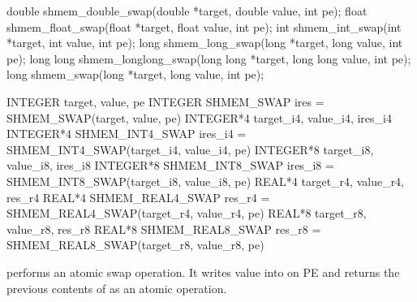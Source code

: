 \synC
 	  
double shmem_double_swap(double *target, double value, int pe);
float shmem_float_swap(float *target, float value, int pe);
int shmem_int_swap(int *target, int value, int pe);
long shmem_long_swap(long *target, long value, int pe);
long long shmem_longlong_swap(long long *target, long long value, int pe);
long shmem_swap(long *target, long value, int pe); %

\synF   %

INTEGER target, value, pe
INTEGER SHMEM_SWAP
ires = SHMEM_SWAP(target, value, pe) 
INTEGER*4 target_i4, value_i4, ires_i4
INTEGER*4 SHMEM_INT4_SWAP
ires_i4 = SHMEM_INT4_SWAP(target_i4, value_i4, pe) 
INTEGER*8 target_i8, value_i8, ires_i8
INTEGER*8 SHMEM_INT8_SWAP
ires_i8 = SHMEM_INT8_SWAP(target_i8, value_i8, pe)
REAL*4 target_r4, value_r4, res_r4
REAL*4 SHMEM_REAL4_SWAP
res_r4 = SHMEM_REAL4_SWAP(target_r4, value_r4, pe) 
REAL*8 target_r8, value_r8, res_r8
REAL*8 SHMEM_REAL8_SWAP
res_r8 = SHMEM_REAL8_SWAP(target_r8, value_r8, pe) %

{        performs  an atomic swap operation. It writes value  into \target{} on \ac{PE} and	returns the previous
       contents of \target{} as an atomic operation. 
}
{
\hfill \\
{
}
}
\eAPI
